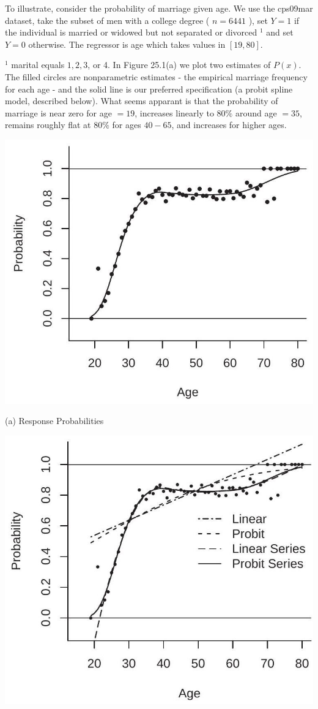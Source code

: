 \documentclass[10pt]{article}
\begin{document}
To illustrate, consider the probability of marriage given age. We use the cps09mar dataset, take the subset of men with a college degree ( $n=6441$ ), set $Y=1$ if the individual is married or widowed but not separated or divorced ${ }^{1}$ and set $Y=0$ otherwise. The regressor is age which takes values in $[19,80]$.

${ }^{1}$ marital equals $1,2,3$, or 4. In Figure 25.1(a) we plot two estimates of $P(x)$. The filled circles are nonparametric estimates - the empirical marriage frequency for each age - and the solid line is our preferred specification (a probit spline model, described below). What seems apparant is that the probability of marriage is near zero for age $=19$, increases linearly to $80 \%$ around age $=35$, remains roughly flat at $80 \%$ for ages $40-65$, and increases for higher ages.

\includegraphics[max width=\textwidth]{2022_10_23_79ac6a85f9738eaa4c30g-02}

(a) Response Probabilities

\includegraphics[max width=\textwidth]{2022_10_23_79ac6a85f9738eaa4c30g-02(1)}
\end{document}
